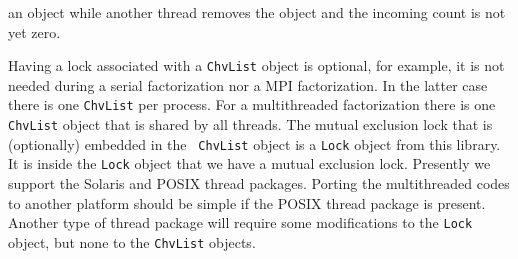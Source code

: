 an object while another thread removes the object and the incoming
count is not yet zero.
\par
Having a lock associated with a {\tt ChvList} object is optional,
for example, it is not needed during a serial factorization nor a
MPI factorization. 
In the latter case there is one {\tt ChvList} per process.
For a multithreaded factorization there is one {\tt ChvList}
object that is shared by all threads.
The mutual exclusion lock that is (optionally) embedded in the {\tt
ChvList} object is a {\tt Lock} object from this library.
It is inside the {\tt Lock} object that we have a
mutual exclusion lock.
Presently we support the Solaris and POSIX thread packages.
Porting the multithreaded codes to another platform should be
simple if the POSIX thread package is present.
Another type of thread package will require some modifications
to the {\tt Lock} object, but none to the {\tt ChvList} objects.
\par
